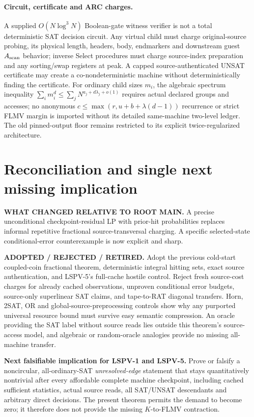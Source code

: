 \documentclass[11pt]{article}
\begin{document}
\paragraph{Circuit, certificate and ARC charges.}
A supplied $O(N\log^3N)$ Boolean-gate witness verifier is not
a total deterministic SAT decision circuit. Any virtual child
must charge original-source probing, its physical length,
headers, body, endmarkers and downstream guest
$A_{\rm scan}$ behavior; inverse Select procedures must charge
source-index preparation and any sorting/swap registers at peak.
A capped source-authenticated UNSAT certificate may create
a co-nondeterministic machine without deterministically finding
the certificate. For ordinary child sizes $m_i$, the algebraic
spectrum inequality
$\sum_i m_i^d\le\sum_j N^{a_j+d\lambda_j+o(1)}$
requires actual declared groups and accesses; no anonymous
$c\le\max(r,u+b+\lambda(d-1))$ recurrence or strict
FLMV margin is imported without its detailed same-machine
two-level ledger. The old pinned-output floor remains
restricted to its explicit twice-regularized architecture.

\section{Reconciliation and single next missing implication}
\textbf{WHAT CHANGED RELATIVE TO ROOT MAIN.} A precise
unconditional checkpoint-residual LP with prior-hit
probabilities replaces informal repetitive fractional
source-transversal charging. A specific selected-state
conditional-error counterexample is now explicit and sharp.

\textbf{ADOPTED / REJECTED / RETIRED.}
Adopt the previous cold-start coupled-coin fractional theorem,
deterministic integral hitting sets, exact source authentication,
and LSPV-5's full-cache hostile control.
Reject fresh source-cost charges for already cached observations,
unproven conditional error budgets, source-only superlinear
SAT claims, and tape-to-RAT diagonal transfers.
Horn, 2SAT, OR and global-source-preprocessing controls show
why any purported universal resource bound must survive
easy semantic compression. An oracle providing the SAT label
without source reads lies outside this theorem's source-access
model, and algebraic or random-oracle analogies provide
no missing all-machine transfer.

\textbf{Next falsifiable implication for LSPV-1 and LSPV-5.}
Prove or falsify a noncircular, all-ordinary-SAT
\emph{unresolved-edge} statement that stays quantitatively
nontrivial after every affordable complete machine checkpoint,
including cached sufficient statistics, actual source reads,
all SAT/UNSAT descendants and arbitrary direct decisions.
The present theorem permits the demand to become zero;
it therefore does not provide the missing $K$-to-FLMV contraction.
\end{document}
